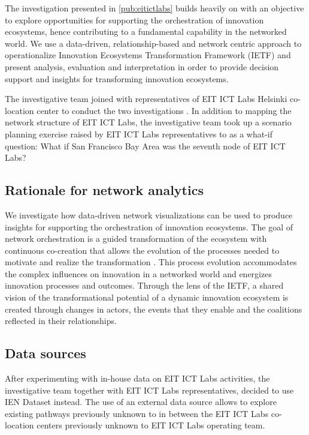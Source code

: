 The investigation presented in \ref{pub:eitictlabs} builds heavily on \cite{Still2012ParadigmDigital} with an objective to explore opportunities for supporting the orchestration of innovation ecosystems, hence contributing to a fundamental capability in the networked world. We use a data-driven, relationship-based and network centric approach to operationalize Innovation Ecosystems Transformation Framework (IETF) \citep{Russell2011TransformingOrchestration} and present analysis, evaluation and interpretation in order to provide decision support and insights for transforming innovation ecosystems.

The investigative team joined with representatives of EIT ICT Labs Helsinki co-location center to conduct the two investigations \citep{Still2012ParadigmDigital,Still2014InsightsVisualisations}. In addition to mapping the network structure of EIT ICT Labs, the investigative team took up a scenario planning exercise raised by EIT ICT Labs representatives to as a what-if question: What if San Francisco Bay Area was the seventh node of EIT ICT Labs? 

\subsection{Rationale for network analytics}

We investigate how data-driven network visualizations can be used to produce insights for supporting the orchestration of innovation ecosystems. The goal of network orchestration is a guided transformation of the ecosystem with continuous co-creation that allows the evolution of the processes needed to motivate and realize the transformation \citep{Russell2011TransformingOrchestration}. This process evolution accommodates the complex influences on innovation in a networked world and energizes innovation processes and outcomes. Through the lens of the IETF, a shared vision of the transformational potential of a dynamic innovation ecosystem is created through changes in actors, the events that they enable and the coalitions reflected in their relationships.

\subsection{Data sources}

After experimenting with in-house data on EIT ICT Labs activities, the investigative team together with EIT ICT Labs representatives, decided to use IEN Dataset instead. The use of an external data source allows to explore existing pathways previously unknown to  in between the EIT ICT Labs co-location centers previously unknown to EIT ICT Labs operating team.

